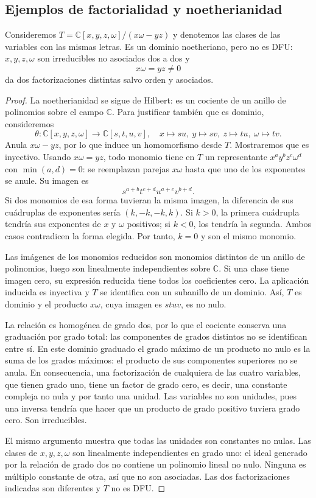 \subsection{Ejemplos de factorialidad y noetherianidad}\label{tema:16-2-3}\label{tema:18-3-2b}
\begin{ejem}\label{ejem:C16-determinante}
Consideremos $T=\mathbb C[x,y,z,\omega]/(x\omega-yz)$ y denotemos las clases de las variables con las mismas letras. Es un dominio noetheriano, pero no es DFU: $x,y,z,\omega$ son irreducibles no asociados dos a dos y
\[
x\omega=yz\ne0
\]
da dos factorizaciones distintas salvo orden y asociados.
\end{ejem}
\begin{proof}
La noetherianidad se sigue de Hilbert: es un cociente de un anillo de polinomios sobre el campo $\mathbb C$. Para justificar también que es dominio, consideremos
\[
\theta:\mathbb C[x,y,z,\omega]\longrightarrow\mathbb C[s,t,u,v],
\quad x\mapsto su,\ y\mapsto sv,\ z\mapsto tu,\ \omega\mapsto tv.
\]
Anula $x\omega-yz$, por lo que induce un homomorfismo desde $T$. Mostraremos que es inyectivo. Usando $x\omega=yz$, todo monomio tiene en $T$ un representante $x^ay^bz^c\omega^d$ con $\min(a,d)=0$: se reemplazan parejas $x\omega$ hasta que uno de los exponentes se anule. Su imagen es
\[
s^{a+b}t^{c+d}u^{a+c}v^{b+d}.
\]
Si dos monomios de esa forma tuvieran la misma imagen, la diferencia de sus cuádruplas de exponentes sería $(k,-k,-k,k)$. Si $k>0$, la primera cuádrupla tendría sus exponentes de $x$ y $\omega$ positivos; si $k<0$, los tendría la segunda. Ambos casos contradicen la forma elegida. Por tanto, $k=0$ y son el mismo monomio.

Las imágenes de los monomios reducidos son monomios distintos de un anillo de polinomios, luego son linealmente independientes sobre $\mathbb C$. Si una clase tiene imagen cero, su expresión reducida tiene todos los coeficientes cero. La aplicación inducida es inyectiva y $T$ se identifica con un subanillo de un dominio. Así, $T$ es dominio y el producto $x\omega$, cuya imagen es $stuv$, es no nulo.

La relación es homogénea de grado dos, por lo que el cociente conserva una graduación por grado total: las componentes de grados distintos no se identifican entre sí. En este dominio graduado el grado máximo de un producto no nulo es la suma de los grados máximos: el producto de sus componentes superiores no se anula. En consecuencia, una factorización de cualquiera de las cuatro variables, que tienen grado uno, tiene un factor de grado cero, es decir, una constante compleja no nula y por tanto una unidad. Las variables no son unidades, pues una inversa tendría que hacer que un producto de grado positivo tuviera grado cero. Son irreducibles.

El mismo argumento muestra que todas las unidades son constantes no nulas. Las clases de $x,y,z,\omega$ son linealmente independientes en grado uno: el ideal generado por la relación de grado dos no contiene un polinomio lineal no nulo. Ninguna es múltiplo constante de otra, así que no son asociadas. Las dos factorizaciones indicadas son diferentes y $T$ no es DFU.
\end{proof}

